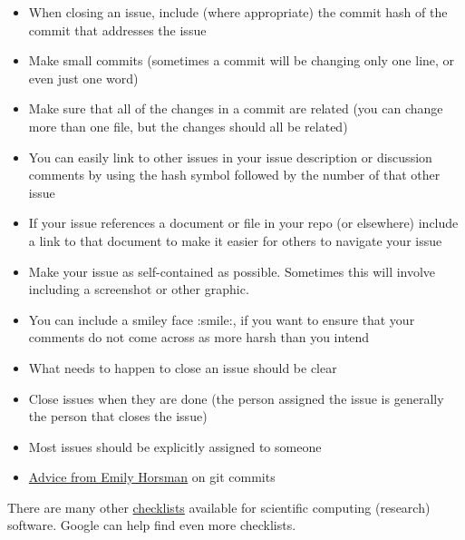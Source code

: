 \documentclass[12pt]{article}
\begin{document}
\begin{itemize}
\item When closing an issue, include (where appropriate) the commit hash of the
  commit that addresses the issue
\item Make small commits (sometimes a commit will be changing only one line, or
  even just one word)
\item Make sure that all of the changes in a commit are related (you can change
  more than one file, but the changes should all be related)
\item You can easily link to other issues in your issue description or
  discussion comments by using the hash symbol followed by the number
  of that other issue
\item If your issue references a document or file in your repo (or elsewhere)
include a link to that document to make it easier for others to navigate your
issue
\item Make your issue as self-contained as possible.  Sometimes this will
involve including a screenshot or other graphic.
\item You can include a smiley face :smile:, if you want to ensure that your
  comments do not come across as more harsh than you intend
\item What needs to happen to close an issue should be clear
\item Close issues when they are done (the person assigned the issue is
  generally the person that closes the issue)
\item Most issues should be explicitly assigned to someone
\item
  \href{https://gitlab.cas.mcmaster.ca/smiths/se2aa4_cs2me3/-/blob/master/FAQ/GitAdvice.txt}
  {Advice from Emily Horsman} on git commits
\end{itemize}

There are many other
\href{https://gitlab.cas.mcmaster.ca/SEforSC/se4sc/-/wikis/Advice-and-Checklists-for-Repos-(including-a-list-of-recommended-artifacts)}{checklists}
available for scientific computing (research) software.  Google can help find
even more checklists.
\end{document}
